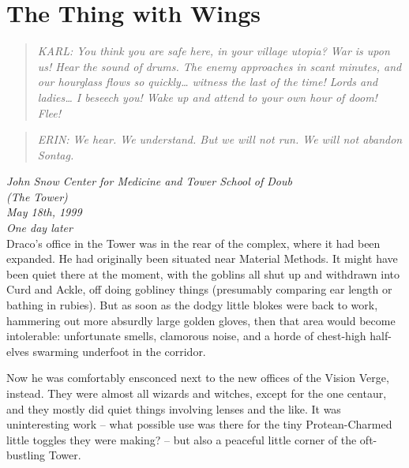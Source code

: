 \hypertarget{the-thing-with-wings}{%
\chapter{The Thing with Wings}\label{the-thing-with-wings}}

\begin{quote}
\emph{KARL: You think you are safe here, in your village utopia? War is
upon us! Hear the sound of drums. The enemy approaches in scant minutes,
and our hourglass flows so quickly\ldots{} witness the last of the time!
Lords and ladies\ldots{} I beseech you! Wake up and attend to your own
hour of doom! Flee!}
\end{quote}

\begin{quote}
\emph{ERIN: We hear. We understand. But we will not run. We will not
abandon Sontag.}
\end{quote}


\mybreak

\emph{John Snow Center for Medicine and Tower School of Doub\\
(The Tower)}\\
\emph{May 18th, 1999}\\
\emph{One day later}\\

Draco's office in the Tower was in the rear of the complex, where it had
been expanded. He had originally been situated near Material Methods. It
might have been quiet there at the moment, with the goblins all shut up
and withdrawn into Curd and Ackle, off doing gobliney things (presumably
comparing ear length or bathing in rubies). But as soon as the dodgy
little blokes were back to work, hammering out more absurdly large
golden gloves, then that area would become intolerable: unfortunate
smells, clamorous noise, and a horde of chest-high half-elves swarming
underfoot in the corridor.

Now he was comfortably ensconced next to the new offices of the Vision
Verge, instead. They were almost all wizards and witches, except for the
one centaur, and they mostly did quiet things involving lenses and the
like. It was uninteresting work -- what possible use was there for the
tiny Protean-Charmed little toggles they were making? -- but also a
peaceful little corner of the oft-bustling Tower.

